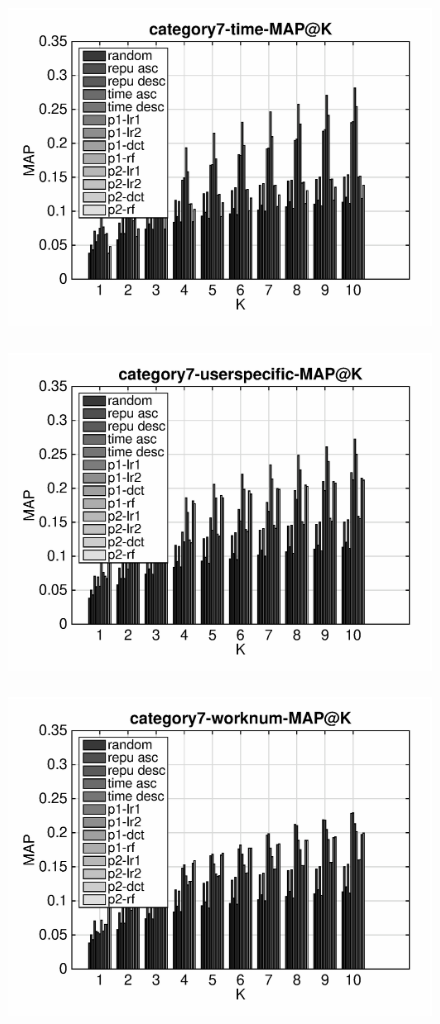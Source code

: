\documentclass{article}
\begin{document}
\begin{figure}[ht]
\begin{flushleft}
\includegraphics[width=18cm,height=9cm]{category7-time-MAP@K.eps}
\includegraphics[width=18cm,height=9cm]{category7-userspecific-MAP@K.eps}
\includegraphics[width=18cm,height=9cm]{category7-worknum-MAP@K.eps}
\end{flushleft}
\end{figure}
\end{document}
